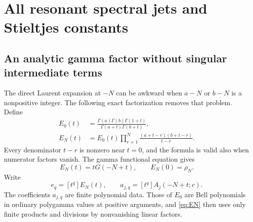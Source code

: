 \section{All resonant spectral jets and Stieltjes constants}\label{sec:jets}

\subsection{An analytic gamma factor without singular intermediate terms}
The direct Laurent expansion at $-N$ can be awkward when $a-N$ or $b-N$
is a nonpositive integer.  The following exact factorization removes that
problem.  Define
\begin{align}
 E_0(t)&=\frac{\Gamma(a)\Gamma(b)\Gamma(1+t)}
               {\Gamma(a+t)\Gamma(b+t)},\label{eq:E0}\\
 E_N(t)&=E_0(t)\prod_{r=1}^N
              \frac{(a+t-r)(b+t-r)}{t-r}.
              \label{eq:EN}
\end{align}
Every denominator $t-r$ is nonzero near $t=0$, and the formula is valid
also when numerator factors vanish.  The gamma functional equation gives
\begin{equation}\label{eq:Eidentity}
 E_N(t)=tG(-N+t),\qquad E_N(0)=\rho_N.
\end{equation}
Write
\[
 e_q=[t^q]E_N(t),\qquad a_{j,q}=[t^q]A_j(-N+t;c).
\]
The coefficients $a_{j,q}$ are finite polynomial data.  Those of $E_0$ are
Bell polynomials in ordinary polygamma values at positive arguments,
and \eqref{eq:EN} then uses only finite products and divisions by
nonvanishing linear factors.

